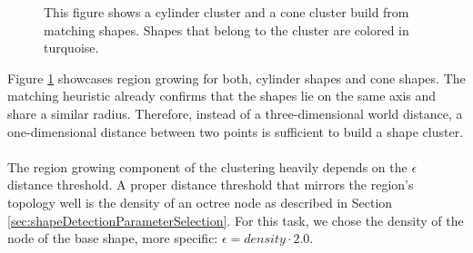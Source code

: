 \begin{figure}
\centering
{}
    \caption[Exemplary cylinder and clone cluster]
		{This figure shows a cylinder cluster and a cone cluster build from matching shapes. Shapes that belong to the cluster are colored in turquoise.}
    \label{fig:regionGrowingConeCylinder}
\end{figure}

Figure \ref{fig:regionGrowingConeCylinder} showcases region growing for both, cylinder shapes and cone shapes. The matching heuristic already confirms that the shapes lie on the same axis and share a similar radius. Therefore, instead of a three-dimensional world distance, a one-dimensional distance between two points is sufficient to build a shape cluster. 
\\
\\
The region growing component of the clustering heavily depends on the $\epsilon$ distance threshold. A proper distance threshold that mirrors the region's topology well is the density of an octree node as described in Section \ref{sec:shapeDetectionParameterSelection}. For this task, we chose the density of the node of the base shape, more specific: $\epsilon = density \cdot 2.0$.